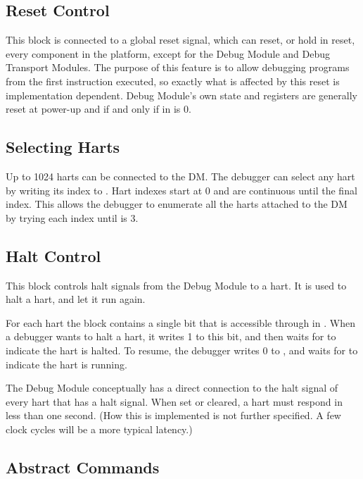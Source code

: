 \documentclass{article}
\begin{document}
\subsection{Reset Control} \label{reset}

This block is connected to a global reset signal, which can
reset, or hold in reset, every component in the platform,
except for the Debug Module and Debug
Transport Modules. The purpose of this feature is to allow debugging
programs from the first instruction executed, so exactly what is affected
by this reset is implementation dependent. Debug Module's own state and registers are
generally reset at power-up and if and only if
\Fdmactive in \Rdmcontrol is 0.

\subsection{Selecting Harts} \label{selectingharts}

Up to 1024 harts can be connected to the DM. The debugger can select any hart
by writing its index to \Fhartsel. Hart indexes start at 0 and are continuous
until the final index. This allows the debugger to enumerate all the harts
attached to the DM by trying each index until \Fhartstatus is 3.

\subsection{Halt Control} \label{haltcontrol}

This block controls halt signals from the Debug Module to a hart.  It is used
to halt a hart, and let it run again.

For each hart the block contains a single bit that is accessible through
\Fhaltreq in \Rdmcontrol. When a debugger wants to halt a hart, it writes 1 to
this bit, and then waits for \Fhartstatus to indicate the hart is halted.  To
resume, the debugger writes 0 to \Fhaltreq, and waits for \Fhartstatus to
indicate the hart is running.

The Debug Module conceptually has a direct connection to the halt signal of
every hart that has a halt signal. When set or cleared, a hart must respond in
less than one second.  (How this is implemented is not further specified. A few
clock cycles will be a more typical latency.)

\subsection{Abstract Commands} \label{abstractcommands}
\end{document}
